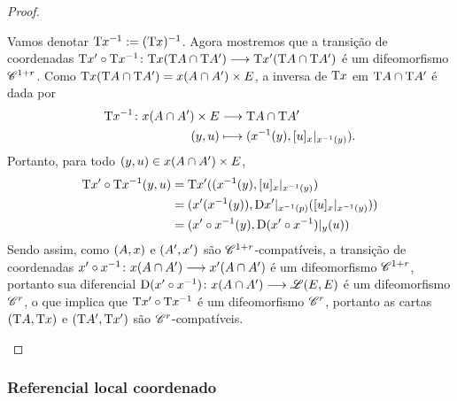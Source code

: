 \begin{proof}
\begin{itemize}
	Vamos denotar $\mathrm{T} x ^{-1} := (\mathrm{T} x)^{-1}$. Agora mostremos que a transição de coordenadas $\mathrm{T} x' \circ \mathrm{T} x^{-1}\colon \allowbreak \mathrm{T} x(\mathrm{T} A \cap \mathrm{T} A') \longrightarrow \mathrm{T} x'(\mathrm{T} A \cap \mathrm{T} A')$ é um difeomorfismo $\mathscr{C}^{1+r}$. Como $\mathrm{T} x(\mathrm{T} A \cap \mathrm{T} A') = x(A \cap A') \times E$, a inversa de $\mathrm{T} x$ em $\mathrm{T} A \cap \mathrm{T} A'$ é dada por
		\begin{align*}
		{\mathrm{T}x^{-1}}\colon {x(A \cap A') \times E} &\longrightarrow {\mathrm{T}A \cap \mathrm{T}A'} \\{(y,u)} &\longmapsto (x^{-1}(y),[u]_{x}|_{x^{-1}(y)}).
		\end{align*}
	Portanto, para todo $(y,u) \in x(A \cap A') \times E$,
		\begin{align*}
		\mathrm{T} x' \circ \mathrm{T} x^{-1}(y,u) &= \mathrm{T} x' ((x^{-1}(y),[u]_{x}|_{x^{-1}(y)}) \\
			&= (x'(x^{-1}(y)), \mathrm{D} x'|_{x^{-1}(p)} ([u]_{x}|_{x^{-1}(y)})) \\
			&= (x' \circ x^{-1}(y), \mathrm{D} (x' \circ x^{-1})|_y(u))
		\end{align*}
	Sendo assim, como $(A, x)$ e $(A', x')$ são $\mathscr{C}^{1+r}$-compatíveis, a transição de coordenadas $x' \circ x^{-1}\colon \allowbreak x(A \cap A') \longrightarrow x'(A \cap A')$ é um difeomorfismo $\mathscr{C}^{1+r}$, portanto sua diferencial $\mathrm{D} (x' \circ x^{-1})\colon \allowbreak x(A \cap A') \longrightarrow \mathscr{L}(E,E)$ é um difeomorfismo $\mathscr{C}^r$,
	o que implica que $\mathrm{T} x' \circ \mathrm{T} x^{-1}$ é um difeomorfismo $\mathscr{C}^r$, portanto as cartas $(\mathrm{T} A, \mathrm{T} x)$ e $(\mathrm{T} A', \mathrm{T} x')$ são $\mathscr{C}^r$-compatíveis.
	\qedhere
	\end{itemize}
\end{proof}
















\subsubsection{Referencial local coordenado}

